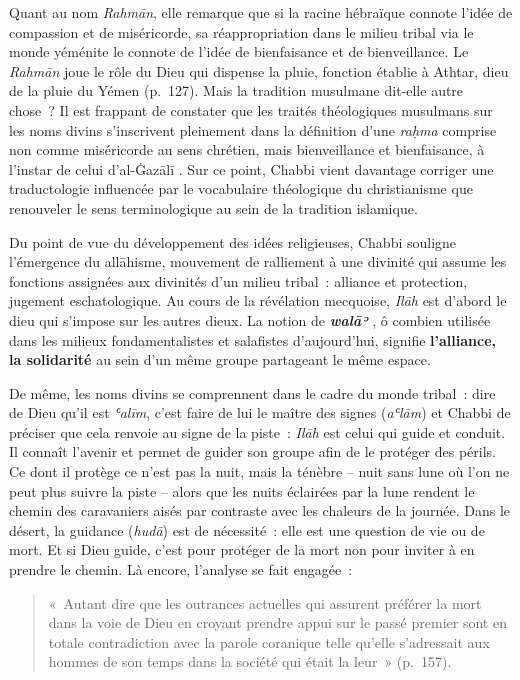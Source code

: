 Quant au nom \emph{Rahmān}, elle remarque que si la racine hébraïque
connote l'idée de compassion et de miséricorde, sa réappropriation dans
le milieu tribal via le monde yéménite le connote de l'idée de
bienfaisance et de bienveillance. Le \emph{Rahmān} joue le rôle du Dieu
qui dispense la pluie, fonction établie à Athtar, dieu de la pluie du
Yémen (p.~127). Mais la tradition musulmane dit-elle autre chose~? Il
est frappant de constater que les traités théologiques musulmans sur les
noms divins s'inscrivent pleinement dans la définition d'une
\emph{raḥma} comprise non comme miséricorde au sens chrétien, mais
bienveillance et bienfaisance, à l'instar de celui d'al-Ġazālī \label{theol:AlGazali23}. Sur ce
point, Chabbi vient davantage corriger une traductologie influencée par
le vocabulaire théologique du christianisme que renouveler le sens
terminologique au sein de la tradition islamique.


Du point de vue du développement des idées religieuses, Chabbi souligne
l'émergence du allāhisme, mouvement de ralliement à une divinité qui
assume les fonctions assignées aux divinités d'un milieu tribal~:
alliance et protection, jugement eschatologique. Au cours de la
révélation mecquoise, \emph{Ilāh} est d'abord le dieu qui s'impose sur
les autres dieux. La notion de \emph{\textbf{walāʾ}} , ô combien
utilisée dans les milieux fondamentalistes et salafistes d'aujourd'hui,
signifie \textbf{l'alliance, la solidarité} au sein d'un même groupe
partageant le même espace.


De même, les noms divins se comprennent dans le cadre du monde tribal~:
dire de Dieu qu'il est \emph{ʿalīm}, c'est faire de lui le maître des
signes (\emph{aʿlām}) et Chabbi de préciser que cela renvoie au signe de
la piste~: \emph{Ilāh} est celui qui guide et conduit. Il connaît
l'avenir et permet de guider son groupe afin de le protéger des périls.
Ce dont il protège ce n'est pas la nuit, mais la ténèbre -- nuit sans
lune où l'on ne peut plus suivre la piste -- alors que les nuits
éclairées par la lune rendent le chemin des caravaniers aisés par
contraste avec les chaleurs de la journée. Dans le désert, la guidance
(\emph{hudā}) est de nécessité~: elle est une question de vie ou de
mort. Et si Dieu guide, c'est pour protéger de la mort non pour inviter
à en prendre le chemin. Là encore, l'analyse se fait engagée~:
\begin{quote}
«~Autant dire que les outrances actuelles qui assurent préférer la mort
dans la voie de Dieu en croyant prendre appui sur le passé premier sont
en totale contradiction avec la parole coranique telle qu'elle
s'adressait aux hommes de son temps dans la société qui était la leur~»
(p.~157).
\end{quote}

